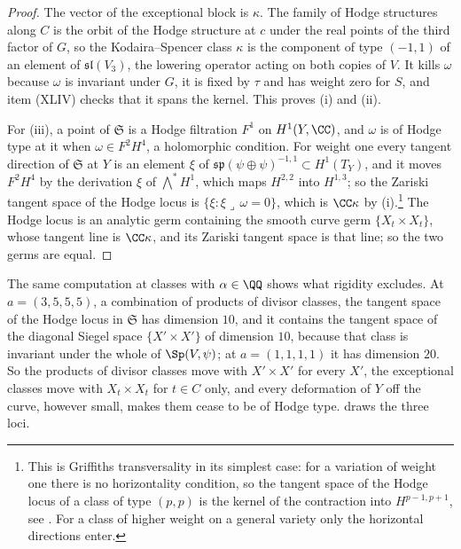 \begin{proof}
The vector of the exceptional block is $\kappa$. The family of Hodge
structures along $C$ is the orbit of the Hodge structure at $c$ under the
real points of the third factor of $G$, so the Kodaira--Spencer class
$\kappa$ is the component of type $(-1,1)$ of an element of
$\mathfrak{sl}(V_{3})$, the lowering operator acting on both copies of $V$.
It kills $\omega$ because $\omega$ is invariant under $G$, it is fixed by
$\tau$ and has weight zero for $S$, and item (XLIV) checks that it spans the
kernel. This proves (i) and (ii).

For (iii), a point of $\mathfrak{S}$ is a Hodge filtration $F^{1}$ on
$H^{1}(Y,\CC)$, and $\omega$ is of Hodge type at it when $\omega\in F^{2}
H^{4}$, a holomorphic condition. For weight one every tangent direction of
$\mathfrak{S}$ at $Y$ is an element $\xi$ of
$\mathfrak{sp}(\psi\oplus\psi)^{-1,1}\subset H^{1}(T_{Y})$, and it moves
$F^{2}H^{4}$ by the derivation $\xi$ of ${\textstyle\bigwedge^{*}}H^{1}$, which maps
$H^{2,2}$ into $H^{1,3}$; so the Zariski tangent space of the Hodge locus is
$\{\xi:\xi\lrcorner\,\omega=0\}$, which is $\CC\kappa$ by (i).\footnote{This is
Griffiths transversality in its simplest case: for a variation of weight one
there is no horizontality condition, so the tangent space of the Hodge locus
of a class of type $(p,p)$ is the kernel of the contraction into
$H^{p-1,p+1}$, see \cite[Chapter~5]{Voi03}. For a class of higher weight on a
general variety only the horizontal directions enter.} The Hodge locus is an
analytic germ containing the smooth curve germ $\{X_{t}\times X_{t}\}$, whose
tangent line is $\CC\kappa$, and its Zariski tangent space is that line; so
the two germs are equal.
\end{proof}

\begin{remark}\label{rem:rigidcompare}
The same computation at classes with $\alpha\in\QQ$ shows what rigidity
excludes. At $a=(3,5,5,5)$, a combination of products of divisor classes, the
tangent space of the Hodge locus in $\mathfrak{S}$ has dimension $10$, and it
contains the tangent space of the diagonal Siegel space
$\{X'\times X'\}$ of dimension $10$, because that class is invariant under
the whole of $\Sp(V,\psi)$; at $a=(1,1,1,1)$ it has dimension $20$. So the
products of divisor classes move with $X'\times X'$ for every $X'$, the
exceptional classes move with $X_{t}\times X_{t}$ for $t\in C$ only, and every
deformation of $Y$ off the curve, however small, makes them cease to be of
Hodge type.  draws the three loci.
\end{remark}

